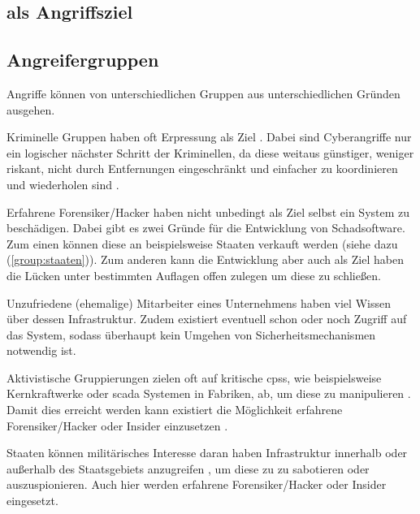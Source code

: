\documentclass[final,bibliography=totocnumbered]{include/sikseminar}
\begin{document}


\subsection{ als Angriffsziel}\label{subsec:angriffsziel}


\subsection{Angreifergruppen}\label{subsec:angreifergruppen}

Angriffe können von unterschiedlichen Gruppen aus unterschiedlichen Gründen ausgehen.

\begin{compactenum}[(a)]
    \item Kriminelle Gruppen haben oft Erpressung als Ziel \cite{CAS+09,WYX+10}.
    Dabei sind Cyberangriffe nur ein logischer nächster Schritt der Kriminellen, da diese weitaus günstiger, weniger riskant, nicht durch Entfernungen eingeschränkt und einfacher zu koordinieren und wiederholen sind \cite{CAS+09}.
    \item Erfahrene Forensiker/Hacker haben nicht unbedingt als Ziel selbst ein System zu beschädigen.
    Dabei gibt es zwei Gründe für die Entwicklung von Schadsoftware.
    Zum einen können diese an beispielsweise Staaten verkauft werden (siehe dazu (\ref{group:staaten})). 
    Zum anderen kann die Entwicklung aber auch als Ziel haben die Lücken unter bestimmten Auflagen offen zulegen um diese zu schließen. 
    \item Unzufriedene (ehemalige) Mitarbeiter eines Unternehmens haben viel Wissen über dessen Infrastruktur.
    Zudem existiert eventuell schon oder noch Zugriff auf das System, sodass überhaupt kein Umgehen von Sicherheitsmechanismen notwendig ist. \cite{CAS+09,WYX+10}
    \item Aktivistische Gruppierungen zielen oft auf kritische \glspl{cps}, wie beispielsweise Kernkraftwerke oder \gls{scada} Systemen in Fabriken, ab, um diese zu manipulieren \cite{CAS+09,WYX+10}. 
    Damit dies erreicht werden kann existiert die Möglichkeit erfahrene Forensiker/Hacker oder Insider einzusetzen \cite{WYX+10}.
    \item Staaten können militärisches Interesse daran haben Infrastruktur innerhalb oder außerhalb des Staatsgebiets anzugreifen \cite{CAS+09}, um diese zu zu sabotieren oder auszuspionieren.
    Auch hier werden erfahrene Forensiker/Hacker oder Insider eingesetzt.
    \label{group:staaten}
\end{compactenum}
\end{document}
